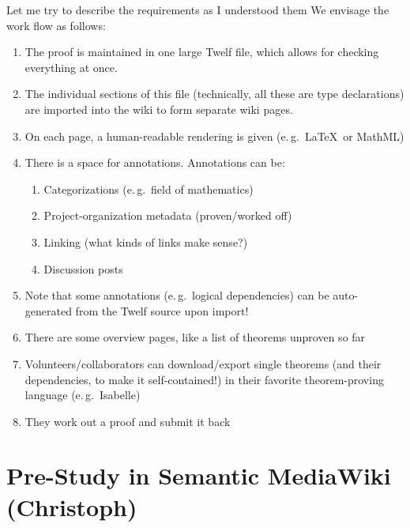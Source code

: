 \documentclass{llncs}
\begin{document}
\begin{newpart}{Let me try to describe the requirements as I understood them}
  We envisage the work flow as follows:
  \begin{enumerate}
  \item The proof is maintained in one large Twelf file, which allows for checking
    everything at once.
  \item The individual sections of this file (technically, all these are type
    declarations) are imported into the wiki to form separate wiki pages.
  \item On each page, a human-readable rendering is given (e.\,g.\ \LaTeX\ or MathML)
  \item There is a space for annotations.  Annotations can be:
    \begin{enumerate}
    \item Categorizations (e.\,g.\ field of mathematics)
    \item Project-organization metadata (proven/worked off)
    \item Linking (what kinds of links make sense?)
    \item Discussion posts
    \end{enumerate}
  \item Note that some annotations (e.\,g.\ logical dependencies) can be auto-generated
    from the Twelf source upon import!
  \item There are some overview pages, like a list of theorems unproven so far
  \item Volunteers/collaborators can download/export single theorems (and their
    dependencies, to make it self-contained!) in their favorite theorem-proving language
    (e.\,g.\ Isabelle)
  \item They work out a proof and submit it back
  \end{enumerate}
\end{newpart}

\section{Pre-Study in Semantic MediaWiki (Christoph)}
\label{sec:smw-study}
\end{document}
